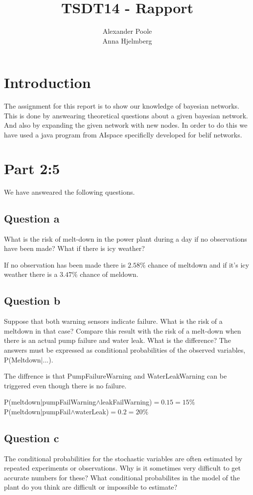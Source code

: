 \documentclass[a4paper,12pt]{article}
\title{TSDT14 - Rapport}
\author{Alexander Poole \\ Anna Hjelmberg}
\begin{document}
\maketitle
	\thispagestyle{empty}
\newpage


\section*{Introduction}

The assignment for this report is to show our knowledge of bayesian networks. This is done by answearing theoretical questions about a given bayesian network. And also by expanding the given network with new nodes. In order to do this we have used a java program from AIspace specificlly developed for belif networks.

\section*{Part 2:5}
We have answeared the following questions.

\subsection*{Question a} 
What is the risk of melt-down in the power plant during a day if no observations have been made? What if there is icy weather?

If no observation has been made there is $2.58\%$ chance of meltdown and if it's icy weather there is a $3.47\%$ chance of meldown.


\subsection*{Question b} 
Suppose that both warning sensors indicate failure. What is the risk of a meltdown in that case? Compare this result with the risk of a melt-down when there is an actual pump failure and water leak. What is the difference? The answers must be expressed as conditional probabilities of the observed variables, P(Meltdown|...).

The diffrence is that PumpFailureWarning and WaterLeakWarning can be triggered even though there is no failure.

P(meltdown|pumpFailWarning$\wedge$leakFailWarning)$=0.15=15\%$\\
P(meltdown|pumpFail$\wedge$waterLeak)$=0.2=20\%$

\subsection*{ Question c} 
The conditional probabilities for the stochastic variables are often estimated by repeated experiments or observations. Why is it sometimes very difficult to get accurate numbers for these? What conditional probabilites in the model of the plant do you think are difficult or impossible to estimate?
\end{document}
